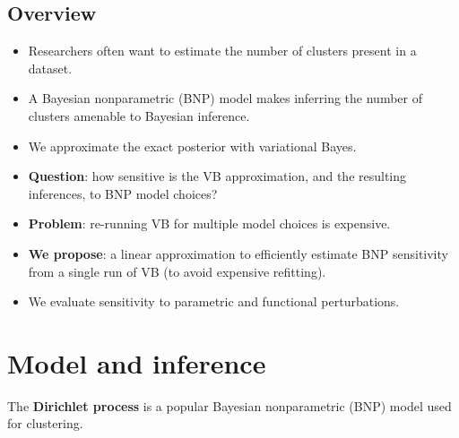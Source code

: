 \documentclass[a0,plainsections,30pt]{sciposter}\usepackage[]{graphicx}\usepackage[]{color}
\begin{document}
\begin{minipage}[t]{0.45\textwidth}

\begin{mdframed}[style=MyFrame]
\section*{Overview}
\vspace{-0.3in}
\begin{itemize}
\item Researchers often want to estimate the number of clusters present in a dataset. 

\item A Bayesian nonparametric (BNP) model makes inferring the number of clusters amenable to Bayesian inference. 

\item We approximate the exact posterior with variational Bayes. 

\item \textbf{Question}: how sensitive is the
VB approximation, and the resulting inferences, to BNP model choices? 

\item \textbf{Problem}: re-running VB for multiple model choices is expensive. 

\item \textbf{We propose}: a linear approximation to efficiently
estimate BNP sensitivity from a single run of VB (to avoid
expensive refitting). 

\item We evaluate sensitivity to parametric and functional perturbations. 

\end{itemize}
\end{mdframed}
\vspace{-0.7in}

\section*{Model and inference }
\vspace{-0.3in}

The \textbf{Dirichlet process} is a popular Bayesian nonparametric
(BNP) model used for clustering.  


\end{minipage}
\end{document}
